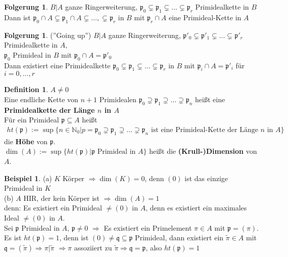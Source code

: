 \documentclass[10pt,a4paper,numbers=endperiod]{scrreprt}
\theoremstyle{definition}
\newtheorem{defi}[satz]{Definition}
\newtheorem{bsp}[satz]{Beispiel}
\newtheorem{folg}[satz]{Folgerung}
\def\NN{{\mathbb N}}
\begin{document}
\begin{folg}
	$B|A$ ganze Ringerweiterung, $\mathfrak{p}_0 \subsetneq \mathfrak{p}_1 \subsetneq \ldots \subsetneq \mathfrak{p}_r$ Primidealkette in $B$\\
	Dann ist $\mathfrak{p}_0 \cap A \subsetneq \mathfrak{p}_1 \cap A \subsetneq \ldots, \subsetneq \mathfrak{p}_r$ in $B$ mit $\mathfrak{p}_r \cap A$ eine Primideal-Kette in $A$
\end{folg}

\begin{folg}
	(''Going up'') $B|A$ ganze Ringerweiterung,  $\mathfrak{p}'_0 \subsetneq \mathfrak{p}'_1 \subsetneq \ldots \subsetneq \mathfrak{p}'_r$ Primidealkette in $A$,\\
	$\mathfrak{p}_0$ Primideal in $B$ mit $\mathfrak{p}_0 \cap A = \mathfrak{p}'_0$\\
	Dann existiert eine Primidealkette $\mathfrak{p}_0 \subsetneq \mathfrak{p}_1 \subsetneq \ldots \subsetneq \mathfrak{p}_r$ in $B$ mit $\mathfrak{p}_i \cap A = \mathfrak{p}'_i$ für $i = 0, \ldots, r$
\end{folg}

\begin{defi}
	$A \neq 0$\\
	Eine endliche Kette von $n+1$ Primidealen $\mathfrak{p}_0 \supsetneq \mathfrak{p}_1 \supsetneq \ldots \supsetneq \mathfrak{p}_n$ heißt eine \textbf{Primidealkette der Länge $n$ in $A$}\\
	Für ein Primideal $\mathfrak{p} \subseteq A$ heißt \begin{align*}
		ht(\mathfrak{p}) := \sup \{n \in \NN_0| p = \mathfrak{p}_0 \supsetneq \mathfrak{p}_1 \supsetneq \ldots \supsetneq \mathfrak{p}_n \text{ ist eine Primideal-Kette der Länge $n$ in $A$}\}
	\end{align*} 
	die \textbf{Höhe} von $\mathfrak{p}$.\\
	$\dim(A) := \sup \{ht(\mathfrak{p})| \mathfrak{p} \text{ Primideal in $A$}\}$ heißt die \textbf{(Krull-)Dimension} von $A$.
\end{defi}

\begin{bsp}
	(a) $K$ Körper $\Rightarrow \dim(K) = 0$, denn $(0)$ ist das einzige Primideal in $K$\\
	(b) $A$ HIR, der kein Körper ist $\Rightarrow \dim(A) = 1$\\
	denn: Es existiert ein Primideal $\neq (0)$ in $A$, denn es existiert ein maximales Ideal $\neq (0)$ in $A$.\\
	Sei $\mathfrak{p}$ Primideal in $A$, $\mathfrak{p} \neq 0$ $\Rightarrow$ Es existiert ein Primelement $\pi \in A$ mit $\mathfrak{p} = (\pi)$.\\
	Es ist $ht(\mathfrak{p}) = 1$, denn ist $(0) \neq \mathfrak{q} \subseteq \mathfrak{p}$ Primideal, dann existiert ein $\tilde{\pi} \in A$ mit $\mathfrak{q} = (\tilde{\pi}) \Rightarrow \pi| \tilde{\pi}$ $\Rightarrow \pi$ assoziiert zu $\tilde{\pi} \Rightarrow \mathfrak{q} = \mathfrak{p}$, also $ht(\mathfrak{p}) = 1$
\end{bsp}
\end{document}
